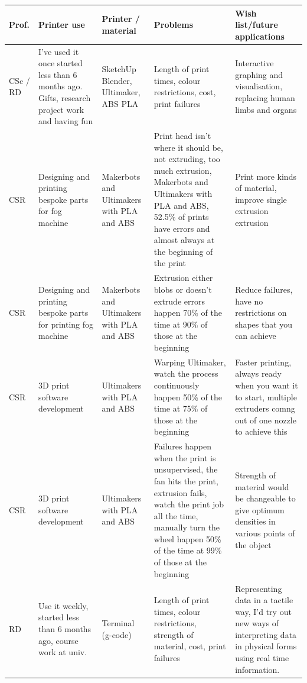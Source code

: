 \documentclass[11pt]{report} %
\begin{document}
\begin{longtable}{| p{1cm} | p{2.5cm} | p{2cm} | p{4cm} | p{4cm} |}
\hline


\textbf{Prof.} & \textbf{Printer use} & \textbf{Printer / material} & \textbf{Problems} & \textbf{Wish list/future applications}\\\hline

CSc / RD & I’ve used it once  started less than 6 months ago. Gifts, research project work and having fun & SketchUp Blender, Ultimaker, ABS PLA & Length of print times, colour restrictions, cost, print failures & Interactive graphing and visualisation, replacing human limbs and organs\\\hline

CSR & Designing and printing bespoke parts for fog machine & Makerbots and Ultimakers with PLA and ABS & Print head isn’t where it should be, not extruding, too much extrusion, Makerbots and Ultimakers with PLA and ABS, 52.5\% of prints have errors and almost always at the beginning of the print  & Print more kinds of material, improve single extrusion extrusion\\\hline

CSR & Designing and printing bespoke parts for printing fog machine & Makerbots and Ultimakers with PLA and ABS & Extrusion either blobs or doesn’t extrude errors happen 70\% of the time at 90\% of those at the beginning & Reduce failures, have no restrictions on shapes that you can achieve\\\hline

CSR & 3D print software development & Ultimakers with PLA and ABS & Warping Ultimaker, watch the process continuously happen 50\%
of the time at 75\% of those at the beginning & Faster printing, always ready when you want it to start, multiple extruders comng out of one nozzle to achieve this\\\hline

CSR & 3D print software development & Ultimakers with PLA and ABS & Failures happen when the print is unsupervised, the fan hits the print, extrusion fails, watch the print job all the time, manually turn the wheel happen 50\% of the time at 99\% of those at the beginning & Strength of material would be changeable to give optimum densities in various points of the object\\\hline

RD & Use it weekly, started less than 6 months ago, course work at univ. & Terminal (g-code) & Length of print times, colour restrictions, strength of material, cost, print failures & Representing data in a tactile way, I'd try out new ways of interpreting data in physical forms using real time information.\\\hline


\end{longtable}
\end{document}
